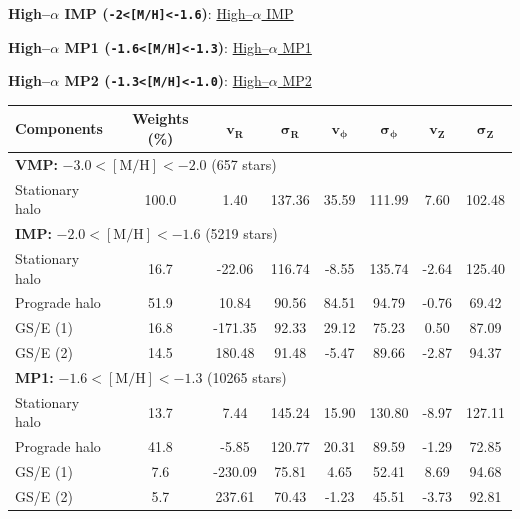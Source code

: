 \documentclass[a4paper,12pt]{article}
\begin{document}
\textbf{High–$\alpha$ IMP (\texttt{-2<[M/H]<-1.6})}:  
\href{https://raw.githack.com/raunaq-rai/Disentangling-the-Milky-Way-using-GMM/main/figures/IMP_high___-2%5BM_H%5D-1.6.html}{High–$\alpha$ IMP}

\textbf{High–$\alpha$ MP1 (\texttt{-1.6<[M/H]<-1.3})}:  
\href{https://raw.githack.com/raunaq-rai/Disentangling-the-Milky-Way-using-GMM/main/figures/MP1_high___-1.6%5BM_H%5D-1.3.html}{High–$\alpha$ MP1}

\textbf{High–$\alpha$ MP2 (\texttt{-1.3<[M/H]<-1.0})}:  
\href{https://raw.githack.com/raunaq-rai/Disentangling-the-Milky-Way-using-GMM/main/figures/MP2_high___-1.3%5BM_H%5D-1.0.html}{High–$\alpha$ MP2}



\begin{table}[H]
\centering
\begin{tabular}{lccccccc}
\hline
\textbf{Components} & \textbf{Weights (\%)} & $\mathbf{v_R}$ & $\boldsymbol{\sigma_R}$ & $\mathbf{v_\phi}$ & $\boldsymbol{\sigma_\phi}$ & $\mathbf{v_Z}$ & $\boldsymbol{\sigma_Z}$ \\
\hline
\multicolumn{8}{l}{\textbf{VMP:} $-3.0 < \mathrm{[M/H]} < -2.0$ (657 stars)} \\
Stationary halo     & 100.0 &   1.40 & 137.36 &  35.59 & 111.99 &  7.60 & 102.48 \\
\hline
\multicolumn{8}{l}{\textbf{IMP:} $-2.0 < \mathrm{[M/H]} < -1.6$ (5219 stars)} \\
Stationary halo     &  16.7 & -22.06 & 116.74 &  -8.55 & 135.74 & -2.64 & 125.40 \\
Prograde halo       &  51.9 &  10.84 &  90.56 &  84.51 &  94.79 & -0.76 &  69.42 \\
GS/E (1)            &  16.8 &-171.35 &  92.33 &  29.12 &  75.23 &  0.50 &  87.09 \\
GS/E (2)            &  14.5 & 180.48 &  91.48 &  -5.47 &  89.66 & -2.87 &  94.37 \\
\hline
\multicolumn{8}{l}{\textbf{MP1:} $-1.6 < \mathrm{[M/H]} < -1.3$ (10265 stars)} \\
Stationary halo     &   13.7 &   7.44 & 145.24 &  15.90 & 130.80 & -8.97 & 127.11 \\
Prograde halo       &   41.8 &  -5.85 & 120.77 &  20.31 &  89.59 & -1.29 &  72.85 \\
GS/E (1)            &   7.6 &-230.09 &  75.81 &   4.65 &  52.41 &  8.69 &  94.68 \\
GS/E (2)            &   5.7 & 237.61 &  70.43 &  -1.23 &  45.51 & -3.73 &  92.81 \\

\end{tabular}
\end{table}
\end{document}
